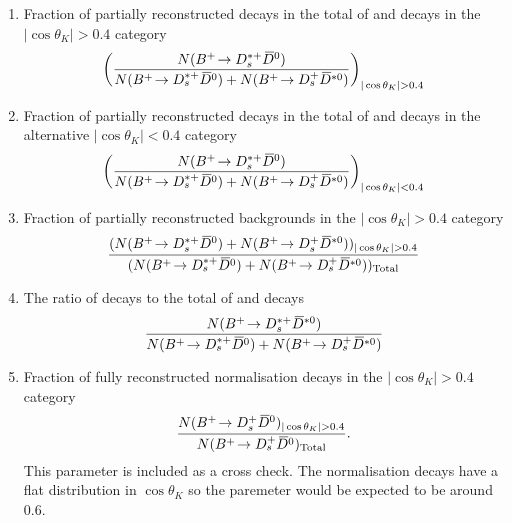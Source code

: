 \begin{enumerate}
\item Fraction of partially reconstructed \decay{\Bp}{\Dssp\Dzb} decays in the total of \decay{\Bp}{\Dssp\Dzb} and \decay{\Bp}{\Dsp\Dstarzb} decays in the $|\cos\theta_{K}|>0.4$ category
\begin{equation}
\left(\frac{N(\decay{\Bp}{\Dssp\Dzb})}{N(\decay{\Bp}{\Dssp\Dzb})+N(\decay{\Bp}{\Dsp\Dstarzb})}\right)_{|\cos\theta_{K}|>0.4}   
\end{equation}
\item Fraction of partially reconstructed \decay{\Bp}{\Dssp\Dzb} decays in the total of \decay{\Bp}{\Dssp\Dzb} and \decay{\Bp}{\Dsp\Dstarzb} decays in the alternative $|\cos\theta_{K}|<0.4$ category
\begin{equation}
\left(\frac{N({{{B}^+}}\!\rightarrow {\ensuremath{{D}^{*+}_{s}}}{\ensuremath{{\kern 0.2em\overline{\kern -0.2em D}{}}{}^0}})}{N({{{B}^+}}\!\rightarrow {\ensuremath{{D}^{*+}_{s}}}{\ensuremath{{\kern 0.2em\overline{\kern -0.2em D}{}}{}^0}})+N({{{B}^+}}\!\rightarrow {\ensuremath{{D}^+_{s}}}{\ensuremath{{\kern 0.2em\overline{\kern -0.2em D}{}}{}^{*0}}})}\right)_{|\cos\theta_{K}|<0.4}   
\end{equation}
\item Fraction of partially reconstructed backgrounds in the $|\cos\theta_{K}|>0.4$ category
\begin{equation}
\frac{(N(\decay{\Bp}{\Dssp\Dzb})+N(\decay{\Bp}{\Dsp\Dstarzb}))_{|\cos\theta_{K}|>0.4}}{(N(\decay{\Bp}{\Dssp\Dzb})+N(\decay{\Bp}{\Dsp\Dstarzb}))_{\text{Total}}}   
\end{equation}
\item The ratio of \decay{\Bp}{\Dssp\Dstarzb} decays to the total of \decay{\Bp}{\Dssp\Dzb} and \decay{\Bp}{\Dsp\Dstarzb} decays
\begin{equation}\frac{N({{{B}^+}}\!\rightarrow {\ensuremath{{D}^{*+}_{s}}}{\ensuremath{{\kern 0.2em\overline{\kern -0.2em D}{}}{}^{*0}}})}{N({{{B}^+}}\!\rightarrow {\ensuremath{{D}^{*+}_{s}}}{\ensuremath{{\kern 0.2em\overline{\kern -0.2em D}{}}{}^0}})+N({{{B}^+}}\!\rightarrow {\ensuremath{{D}^+_{s}}}{\ensuremath{{\kern 0.2em\overline{\kern -0.2em D}{}}{}^{*0}}})}   
\end{equation}
\item Fraction of fully reconstructed normalisation decays in the $|\cos\theta_{K}|>0.4$ category
\begin{equation}
\frac{N(\decay{\Bp}{\Dsp\Dzb})_{|\cos\theta_{K}|>0.4}}{N(\decay{\Bp}{\Dsp\Dzb})_{\text{Total}}}.   
\end{equation}
This parameter is included as a cross check. The normalisation decays have a flat distribution in $\cos\theta_{K}$ so the paremeter would be expected to be around $0.6$. 
\end{enumerate}



